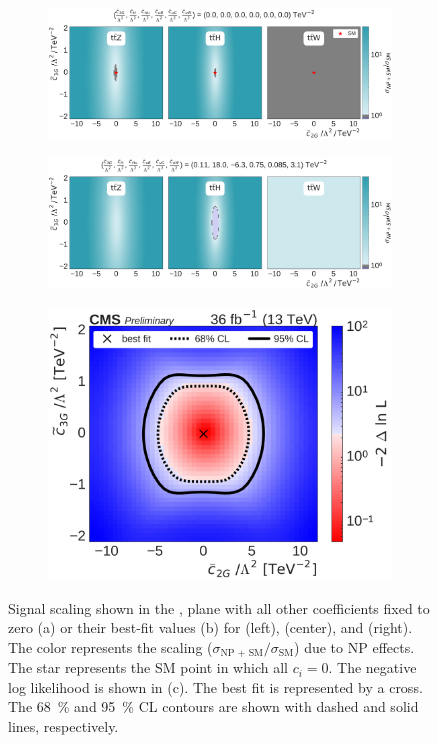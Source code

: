 \begin{figure}
  \vspace{-1cm}
  \begin{subfigure}{\linewidth}
    \centering
    \includegraphics[width=\linewidth]{figures/thirteen-TeV/scaling-frozen/c2G_tc3G}
    \caption{}
  \end{subfigure}
  \begin{subfigure}{\linewidth}
    \centering
    \includegraphics[width=\linewidth]{figures/thirteen-TeV/scaling/c2G_tc3G}
    \caption{}
  \end{subfigure}
  \begin{subfigure}{\linewidth}
    \centering
    \includegraphics[width=0.6\linewidth]{figures/thirteen-TeV/nll/c2G_tc3G}
    \caption{}
  \end{subfigure}
  \vspace{-1cm}
  \setlength{\capwidth}{15cm}
  \caption[Signal scaling and profile likelihood scan in the \tcthreeG, \ctwoG plane]{Signal scaling
  shown in the \tcthreeG, \ctwoG plane with all other coefficients fixed to zero (a) or their
  best-fit values (b) for \ttZ (left), \ttH (center), and \ttW (right). The color represents the
  scaling ($\sigma_\text{NP + SM} / \sigma_\text{SM}$) due to NP effects. The star represents the SM
  point in which all $c_i=0$. The negative log likelihood is shown in (c). The best fit is represented
  by a cross. The \SI{68}{\percent} and \SI{95}{\percent} CL contours are shown with dashed and solid
  lines, respectively.}
\end{figure}

